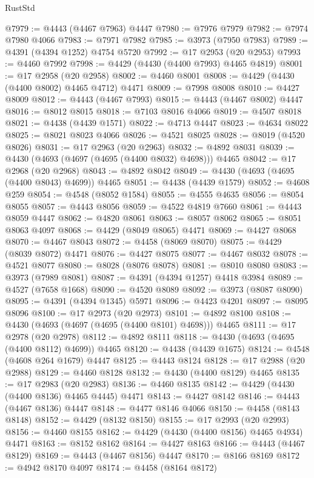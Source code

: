 \begin{lexlean}{RustStd}
\begin{coremodule}
@7979 := @4443 (@4467 @7963) @4447
@7980 := @7976 @7979
@7982 := @7974 @7980 @4066
@7983 := @7971 @7982
@7985 := @3973 (@7950 @7983)
@7989 := @4391 (@4394 @1252) @4754 @5720
@7992 := @17 @2953 (@20 @2953)
@7993 := @4460 @7992
@7998 := @4429 (@4430 (@4400 @7993) @4465 @4819)
@8001 := @17 @2958 (@20 @2958)
@8002 := @4460 @8001
@8008 := @4429 (@4430 (@4400 @8002) @4465 @4712) @4471
@8009 := @7998 @8008
@8010 := @4427 @8009
@8012 := @4443 (@4467 @7993)
@8015 := @4443 (@4467 @8002) @4447
@8016 := @8012 @8015
@8018 := @7103 @8016 @4066
@8019 := @4507 @8018
@8021 := @4438 (@4439 @1571)
@8022 := @4713 @4447
@8023 := @4634 @8022
@8025 := @8021 @8023 @4066
@8026 := @4521 @8025
@8028 := @8019 (@4520 @8026)
@8031 := @17 @2963 (@20 @2963)
@8032 := @4892 @8031
@8039 := @4430 (@4693 (@4697 (@4695 (@4400 @8032) @4698))) @4465
@8042 := @17 @2968 (@20 @2968)
@8043 := @4892 @8042
@8049 := @4430 (@4693 (@4695 (@4400 @8043) @4699)) @4465
@8051 := @4438 (@4439 @1579)
@8052 := @4608 @259
@8054 := @4548 (@8052 @1584)
@8055 := @4555 @4635
@8056 := @8054 @8055
@8057 := @4443 @8056
@8059 := @4522 @4819 @7660
@8061 := @4443 @8059 @4447
@8062 := @4820 @8061
@8063 := @8057 @8062
@8065 := @8051 @8063 @4097
@8068 := @4429 (@8049 @8065) @4471
@8069 := @4427 @8068
@8070 := @4467 @8043
@8072 := @4458 (@8069 @8070)
@8075 := @4429 (@8039 @8072) @4471
@8076 := @4427 @8075
@8077 := @4467 @8032
@8078 := @4521 @8077
@8080 := @8028 (@8076 @8078)
@8081 := @8010 @8080
@8083 := @3973 (@7989 @8081)
@8087 := @4391 (@4394 @1257) @4418 @3984
@8089 := @4527 (@7658 @1668)
@8090 := @4520 @8089
@8092 := @3973 (@8087 @8090)
@8095 := @4391 (@4394 @1345) @5971
@8096 := @4423 @4201
@8097 := @8095 @8096
@8100 := @17 @2973 (@20 @2973)
@8101 := @4892 @8100
@8108 := @4430 (@4693 (@4697 (@4695 (@4400 @8101) @4698))) @4465
@8111 := @17 @2978 (@20 @2978)
@8112 := @4892 @8111
@8118 := @4430 (@4693 (@4695 (@4400 @8112) @4699)) @4465
@8120 := @4438 (@4439 @1675)
@8124 := @4548 (@4608 @264 @1679) @4447
@8125 := @4443 @8124
@8128 := @17 @2988 (@20 @2988)
@8129 := @4460 @8128
@8132 := @4430 (@4400 @8129) @4465
@8135 := @17 @2983 (@20 @2983)
@8136 := @4460 @8135
@8142 := @4429 (@4430 (@4400 @8136) @4465 @4445) @4471
@8143 := @4427 @8142
@8146 := @4443 (@4467 @8136) @4447
@8148 := @4477 @8146 @4066
@8150 := @4458 (@8143 @8148)
@8152 := @4429 (@8132 @8150)
@8155 := @17 @2993 (@20 @2993)
@8156 := @4460 @8155
@8162 := @4429 (@4430 (@4400 @8156) @4465 @4934) @4471
@8163 := @8152 @8162
@8164 := @4427 @8163
@8166 := @4443 (@4467 @8129)
@8169 := @4443 (@4467 @8156) @4447
@8170 := @8166 @8169
@8172 := @4942 @8170 @4097
@8174 := @4458 (@8164 @8172)

\end{coremodule}
\end{lexlean}
